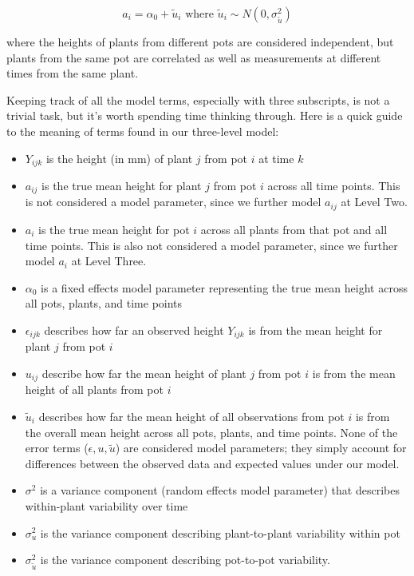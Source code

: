 \documentclass[
]{krantz}
\providecommand{\tightlist}{%
  \setlength{\itemsep}{0pt}\setlength{\parskip}{0pt}}
\begin{document}
\begin{equation}
a_{i} = \alpha_{0}+\tilde{u}_{i} \textrm{ where } \tilde{u}_{i} \sim N(0,\sigma_{\tilde{u}}^{2})
\label{eq:initunun3}
\end{equation}

where the heights of plants from different pots are considered independent, but plants from the same pot are correlated as well as measurements at different times from the same plant.

Keeping track of all the model terms, especially with three subscripts, is not a trivial task, but it's worth spending time thinking through. Here is a quick guide to the meaning of terms found in our three-level model:

\begin{itemize}
\tightlist
\item
  \(Y_{ijk}\) is the height (in mm) of plant \(j\) from pot \(i\) at time \(k\)
\item
  \(a_{ij}\) is the true mean height for plant \(j\) from pot \(i\) across all time points. This is not considered a model parameter, since we further model \(a_{ij}\) at Level Two.
\item
  \(a_{i}\) is the true mean height for pot \(i\) across all plants from that pot and all time points. This is also not considered a model parameter, since we further model \(a_{i}\) at Level Three.
\item
  \(\alpha_{0}\) is a fixed effects model parameter representing the true mean height across all pots, plants, and time points
\item
  \(\epsilon_{ijk}\) describes how far an observed height \(Y_{ijk}\) is from the mean height for plant \(j\) from pot \(i\)
\item
  \(u_{ij}\) describe how far the mean height of plant \(j\) from pot \(i\) is from the mean height of all plants from pot \(i\)
\item
  \(\tilde{u}_{i}\) describes how far the mean height of all observations from pot \(i\) is from the overall mean height across all pots, plants, and time points. None of the error terms (\(\epsilon, u, \tilde{u}\)) are considered model parameters; they simply account for differences between the observed data and expected values under our model.
\item
  \(\sigma^2\) is a variance component (random effects model parameter) that describes within-plant variability over time
\item
  \(\sigma_{u}^{2}\) is the variance component describing plant-to-plant variability within pot
\item
  \(\sigma_{\tilde{u}}^{2}\) is the variance component describing pot-to-pot variability.
\end{itemize}
\end{document}
